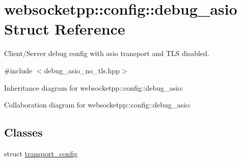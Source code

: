 \hypertarget{structwebsocketpp_1_1config_1_1debug__asio}{}\section{websocketpp\+:\+:config\+:\+:debug\+\_\+asio Struct Reference}
\label{structwebsocketpp_1_1config_1_1debug__asio}


Client/\+Server debug config with asio transport and T\+LS disabled.  




{\ttfamily \#include $<$debug\+\_\+asio\+\_\+no\+\_\+tls.\+hpp$>$}



Inheritance diagram for websocketpp\+:\+:config\+:\+:debug\+\_\+asio\+:


Collaboration diagram for websocketpp\+:\+:config\+:\+:debug\+\_\+asio\+:
\subsection*{Classes}
\begin{DoxyCompactItemize}
\item 
struct \mbox{\hyperlink{structwebsocketpp_1_1config_1_1debug__asio_1_1transport__config}{transport\+\_\+config}}
\end{DoxyCompactItemize}
